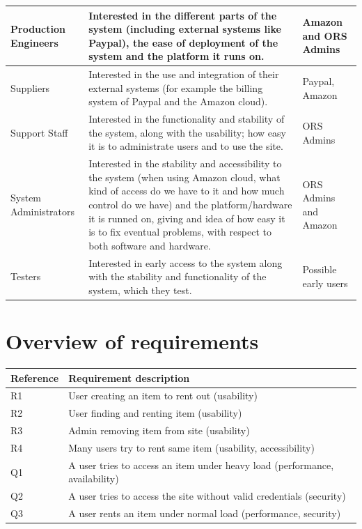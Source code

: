 \documentclass[a4paper,11pt]{report}
\begin{document}
\begin{center}
\begin{longtable}[H]{| l |  p{6cm} | p{2cm} |}
    \hline
    Production Engineers & Interested in the different parts of the system (including external systems like Paypal), the ease of deployment of the system and the platform it runs on. & Amazon and ORS Admins\\
    \hline
    Suppliers & Interested in the use and integration of their external systems (for example the billing system of Paypal and the Amazon cloud). & Paypal, Amazon\\
    \hline
    Support Staff & Interested in the functionality and stability of the system, along with the usability; how easy it is to administrate users and to use the site. & ORS Admins \\
    \hline
    System Administrators & Interested in the stability and accessibility to the system (when using Amazon cloud, what kind of access do we have to it and how much control do we have) and the platform/hardware it is runned on, giving and idea of how easy it is to fix eventual problems, with respect to both software and hardware. & ORS Admins and Amazon \\
    \hline
    Testers & Interested in early access to the system along with the stability and functionality of the system, which they test. & Possible early users\\
    \hline
  \end{longtable}
\end{center}


\section{Overview of requirements}\label{sec:overv-requ}
\begin{center}
  \begin{tabular}[h]{| l |  l |}
    \hline
    \textbf{Reference} & \textbf{Requirement description} \\
    \hline
    R1 & User creating an item to rent out (usability)\\
    \hline
    R2 & User finding and renting item (usability)\\
    \hline
    R3 & Admin removing item from site (usability)\\
    \hline
    R4 & Many users try to rent same item (usability, accessibility)\\
    \hline
    Q1 & A user tries to access an item under heavy load (performance, availability)\\
    \hline
    Q2 & A user tries to access the site without valid credentials (security)\\
    \hline
    Q3 & A user rents an item under normal load (performance, security)\\
    \hline
  \end{tabular}
\end{center}
\end{document}
